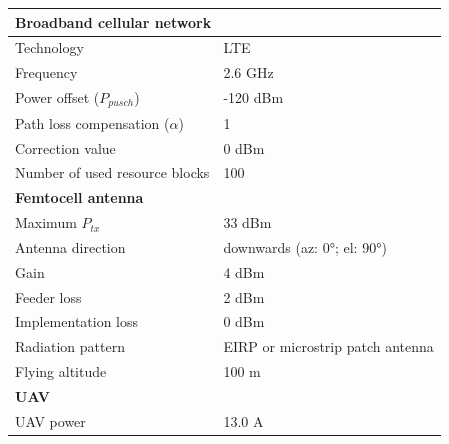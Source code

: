\begin{table}[!htb]
\centering
\begin{tabular}[t]{m{8cm} m{7cm}}
        \toprule
        \multicolumn{2}{l}{\textbf{Broadband cellular network}} \\
        \hline
        \hspace{3mm}  Technology                          & LTE     \\
        \hspace{3mm}  Frequency                           & 2.6 GHz \\
        \hspace{3mm}  Power offset ($P_{pusch}$)            & -120 dBm  \\
        \hspace{3mm}  Path loss compensation ($\alpha$)   & 1  \\
        \hspace{3mm}  Correction value                    & 0 dBm  \\
        \hspace{3mm}  Number of used resource blocks      & 100  \\
        \hline
        \multicolumn{2}{l}{\textbf{Femtocell antenna}} \\
        \hline  
        \hspace{3mm}  Maximum $P_{tx}$                    & 33 dBm   \\
        \hspace{3mm}  Antenna  direction                  & downwards (az: \ang{0}; el: \ang{90})    \\ 
        \hspace{3mm}  Gain                                & 4 dBm   \\ 
        \hspace{3mm}  Feeder loss                         & 2 dBm   \\ 
        \hspace{3mm}  Implementation loss                 & 0 dBm   \\
        \hspace{3mm}  Radiation pattern                   & \acs{EIRP} or microstrip patch antenna\\
        \hspace{3mm}  Flying altitude                     & 100 m  \\
        \hline
        \multicolumn{2}{l}{\textbf{UAV}} \\
        \hline  
        \hspace{3mm}  UAV power                           & 13.0 A   \\

\end{tabular}
\end{table}
